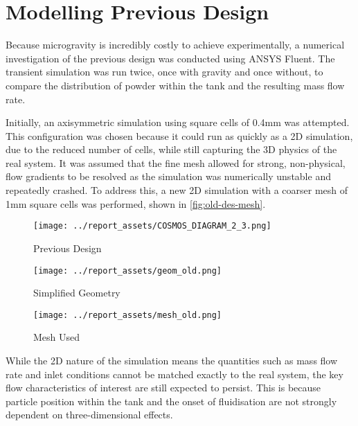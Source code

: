 \section{Modelling Previous Design}\label{sec:old-design-method}
Because microgravity is incredibly costly to achieve experimentally, a numerical investigation of the previous design was conducted using ANSYS Fluent. The transient simulation was run twice, once with gravity and once without, to compare the distribution of powder within the tank and the resulting mass flow rate. 

Initially, an axisymmetric simulation using square cells of 0.4mm was attempted. This configuration was chosen because it could run as quickly as a 2D simulation, due to the reduced number of cells, while still capturing the 3D physics of the real system. It was assumed that the fine mesh allowed for strong, non-physical, flow gradients to be resolved as the simulation was numerically unstable and repeatedly crashed. To address this, a new 2D simulation with a coarser mesh of 1mm square cells was performed, shown in \autoref{fig:old-des-mesh}.
\begin{figure}[htbp]
    \centering

    \begin{minipage}{0.25\textwidth}
        \centering
        \texttt{[image: ../report\_assets/COSMOS\_DIAGRAM\_2\_3.png]}
        \caption{Previous Design}
    \end{minipage}
    \hfill
    \begin{minipage}{0.25\textwidth}
        \centering
        \texttt{[image: ../report\_assets/geom\_old.png]}
        \caption{Simplified Geometry}\label{fig:simpl-geom}
    \end{minipage}
    \hfill
    \begin{minipage}{0.25\textwidth}
        \centering
        \texttt{[image: ../report\_assets/mesh\_old.png]}
        \caption{Mesh Used}\label{fig:old-des-mesh}
    \end{minipage}
    
\end{figure}
While the 2D nature of the simulation means the quantities such as mass flow rate and inlet conditions cannot be matched exactly to the real system, the key flow characteristics of interest are still expected to persist. This is because particle position within the tank and the onset of fluidisation are not strongly dependent on three-dimensional effects.

